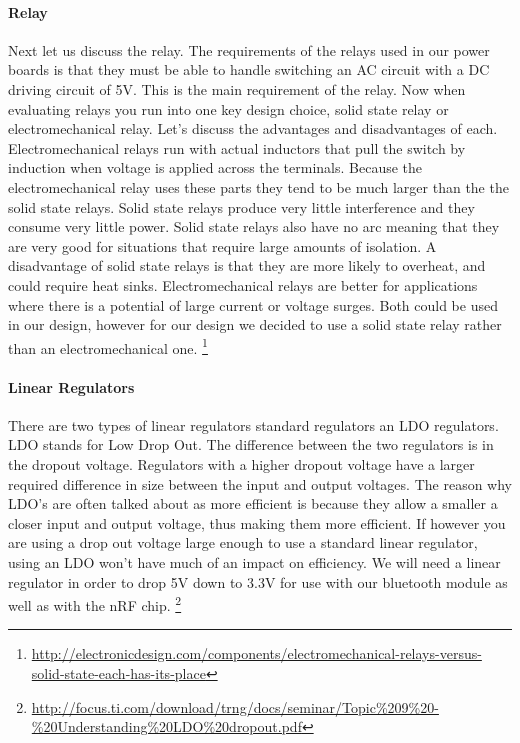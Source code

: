 \paragraph{Relay}
Next let us discuss the relay. The requirements of the relays used in our power
boards is that they must be able to handle switching an AC circuit with a DC
driving circuit of 5V. This is the main requirement of the relay. Now when
evaluating relays you run into one key design choice, solid state relay or
electromechanical relay. Let{}'s discuss the advantages and disadvantages of
each. Electromechanical relays run with actual inductors that pull the switch
by induction when voltage is applied across the terminals. Because the
electromechanical relay uses these parts they tend to be much larger than the
the solid state relays. Solid state relays produce very little interference and
they consume very little power. Solid state relays also have no arc meaning
that they are very good for situations that require large amounts of isolation.
A disadvantage of solid state relays is that they are more likely to overheat,
and could require heat sinks. Electromechanical relays are better for
applications where there is a potential of large current or voltage surges.
Both could be used in our design, however for our design we decided to use a
solid state relay rather than an electromechanical one.
\footnote{\url{http://electronicdesign.com/components/electromechanical-relays-versus-solid-state-each-has-its-place}}

\paragraph{Linear Regulators}
There are two types of linear regulators standard regulators an LDO regulators.
LDO stands for Low Drop Out. The difference between the two regulators is in
the dropout voltage. Regulators with a higher dropout voltage have a larger
required difference in size between the input and output voltages. The reason
why LDO{}'s are often talked about as more efficient is because they allow a
smaller a closer input and output voltage, thus making them more efficient. If
however you are using a drop out voltage large enough to use a standard linear
regulator, using an LDO won{}'t have much of an impact on efficiency. We will
need a linear regulator in order to drop 5V down to 3.3V for use with our
bluetooth module as well as with the nRF chip.
\footnote{\url{http://focus.ti.com/download/trng/docs/seminar/Topic\%209\%20-\%20Understanding\%20LDO\%20dropout.pdf}}

